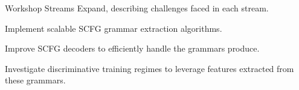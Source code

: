 \documentclass{beamer}
\newenvironment{unpacked_itemize}{
\begin{itemize}
  \setlength{\itemsep}{10pt}
  \setlength{\parskip}{0pt}
  \setlength{\parsep}{0pt}
}{\end{itemize}}
\begin{document}


\begin{frame}[t]{Workshop Streams}
Expand, describing challenges faced in each stream.
\vspace{0.25in}
\begin{unpacked_itemize}
\item Implement scalable SCFG grammar extraction algorithms.
\item Improve SCFG decoders to efficiently handle the grammars produce.
\item Investigate discriminative training regimes to leverage features extracted from these grammars.
\end{unpacked_itemize}
\end{frame}
\end{document}
